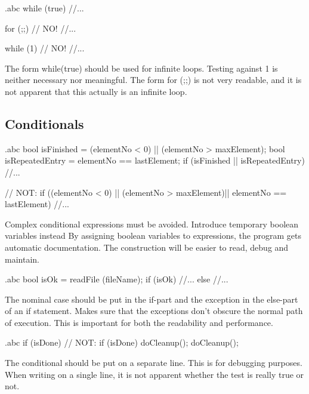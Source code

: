 \begin{filecontents*}{\jobname.abc}
	while (true) {
		//...
	}

	for (;;) {  // NO!
		//...
	}

	while (1) { // NO!
		//...
	}
\end{filecontents*}

\recommendation
{The form while(true) should be used for infinite loops.}
{}
{Testing against 1 is neither necessary nor meaningful. The form for (;;) is not very readable, and it is not apparent that this actually is an infinite loop.}

\subsection{Conditionals}


\begin{filecontents*}{\jobname.abc}
	bool isFinished = (elementNo < 0) || (elementNo > maxElement);
	bool isRepeatedEntry = elementNo == lastElement;
	if (isFinished || isRepeatedEntry) {
		//...
	}
	
	// NOT:
	if ((elementNo < 0) || (elementNo > maxElement)||
	elementNo == lastElement) {
		//...
	}
\end{filecontents*}

\recommendation
{Complex conditional expressions must be avoided. Introduce temporary boolean variables instead}
{}
{By assigning boolean variables to expressions, the program gets automatic documentation. The construction will be easier to read, debug and maintain.}


\begin{filecontents*}{\jobname.abc}
	bool isOk = readFile (fileName);
	if (isOk) {
		//...
	}
	else {
		//...
	}
\end{filecontents*}

\recommendation
{The nominal case should be put in the if-part and the exception in the else-part of an if statement.}
{}
{Makes sure that the exceptions don't obscure the normal path of execution. This is important for both the readability and performance.}


\begin{filecontents*}{\jobname.abc}
	if (isDone)  // NOT: if (isDone) doCleanup();
		doCleanup();
\end{filecontents*}

\recommendation
{The conditional should be put on a separate line.}
{}
{This is for debugging purposes. When writing on a single line, it is not apparent whether the test is really true or not.}


